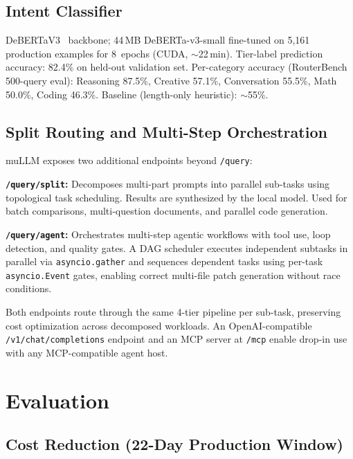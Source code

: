 \documentclass[11pt]{article}
\begin{document}
\subsection{Intent Classifier}

DeBERTaV3~\cite{he2021debertav3} backbone; 44\,MB DeBERTa-v3-small
fine-tuned on 5,161 production examples for 8~epochs (CUDA, $\sim$22\,min).
Tier-label prediction accuracy: 82.4\% on held-out validation set.
Per-category accuracy (RouterBench 500-query eval): Reasoning 87.5\%,
Creative 57.1\%, Conversation 55.5\%, Math 50.0\%, Coding 46.3\%.
Baseline (length-only heuristic): $\sim$55\%.

\subsection{Split Routing and Multi-Step Orchestration}

muLLM exposes two additional endpoints beyond \texttt{/query}:

\textbf{\texttt{/query/split}:} Decomposes multi-part prompts into
parallel sub-tasks using topological task scheduling. Results are
synthesized by the local model. Used for batch comparisons,
multi-question documents, and parallel code generation.

\textbf{\texttt{/query/agent}:} Orchestrates multi-step agentic
workflows with tool use, loop detection, and quality gates. A DAG
scheduler executes independent subtasks in parallel via
\texttt{asyncio.gather} and sequences dependent tasks using
per-task \texttt{asyncio.Event} gates, enabling correct multi-file
patch generation without race conditions.

Both endpoints route through the same 4-tier pipeline per sub-task,
preserving cost optimization across decomposed workloads. An
OpenAI-compatible \texttt{/v1/chat/completions} endpoint and an MCP
server at \texttt{/mcp} enable drop-in use with any MCP-compatible
agent host.

\section{Evaluation}

\subsection{Cost Reduction (22-Day Production Window)}
\end{document}
